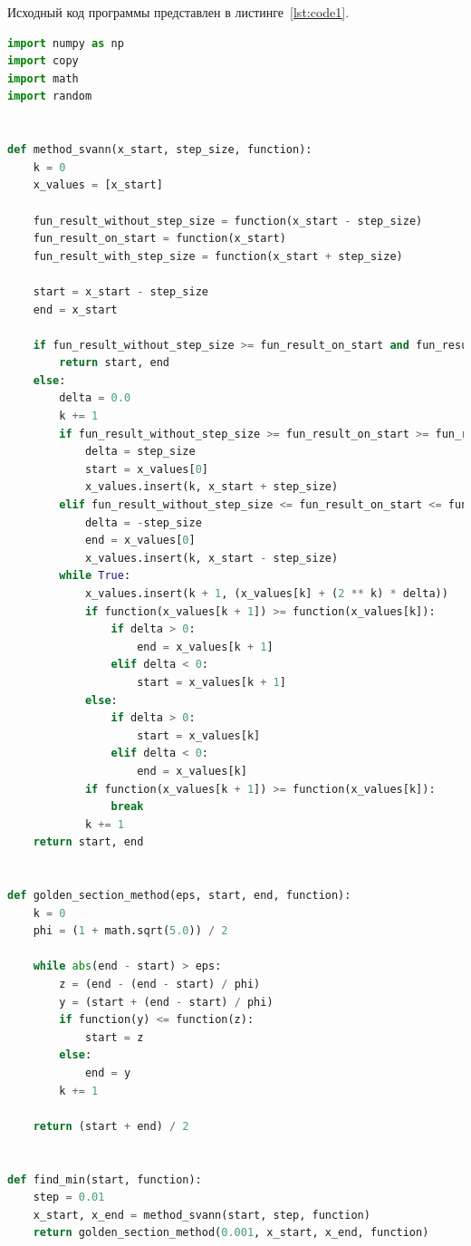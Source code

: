 \documentclass[a4paper, 14pt]{extarticle}
\begin{document}
Исходный код программы представлен в листинге~\ref{lst:code1}.   

\begin{lstlisting}[language={python},caption={Методы многомерного поиска. Генетический алгоритм},label={lst:code1}]
import numpy as np
import copy
import math
import random


def method_svann(x_start, step_size, function):
    k = 0
    x_values = [x_start]

    fun_result_without_step_size = function(x_start - step_size)
    fun_result_on_start = function(x_start)
    fun_result_with_step_size = function(x_start + step_size)

    start = x_start - step_size
    end = x_start

    if fun_result_without_step_size >= fun_result_on_start and fun_result_on_start <= fun_result_with_step_size:
        return start, end
    else:
        delta = 0.0
        k += 1
        if fun_result_without_step_size >= fun_result_on_start >= fun_result_with_step_size:
            delta = step_size
            start = x_values[0]
            x_values.insert(k, x_start + step_size)
        elif fun_result_without_step_size <= fun_result_on_start <= fun_result_with_step_size:
            delta = -step_size
            end = x_values[0]
            x_values.insert(k, x_start - step_size)
        while True:
            x_values.insert(k + 1, (x_values[k] + (2 ** k) * delta))
            if function(x_values[k + 1]) >= function(x_values[k]):
                if delta > 0:
                    end = x_values[k + 1]
                elif delta < 0:
                    start = x_values[k + 1]
            else:
                if delta > 0:
                    start = x_values[k]
                elif delta < 0:
                    end = x_values[k]
            if function(x_values[k + 1]) >= function(x_values[k]):
                break
            k += 1
    return start, end


def golden_section_method(eps, start, end, function):
    k = 0
    phi = (1 + math.sqrt(5.0)) / 2

    while abs(end - start) > eps:
        z = (end - (end - start) / phi)
        y = (start + (end - start) / phi)
        if function(y) <= function(z):
            start = z
        else:
            end = y
        k += 1

    return (start + end) / 2


def find_min(start, function):
    step = 0.01
    x_start, x_end = method_svann(start, step, function)
    return golden_section_method(0.001, x_start, x_end, function)



\end{lstlisting}
\end{document}
